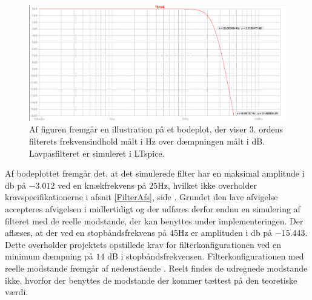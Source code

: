 \begin{figure}[H]
	\centering
	\includegraphics[scale=0.4]{figures/cProblemloesning/Lavpasfiltergraf_LTspice1.PNG}
	\caption{Af figuren fremgår en illustration på et bodeplot, der viser 3. ordens filterets frekvensindhold målt i Hz over dæmpningen målt i dB. Lavpasfilteret er simuleret i LTspice.}
	\label{fig:lavpasfilter_LTspice}
\end{figure}
\noindent Af bodeplottet fremgår det, at det simulerede filter har en maksimal amplitude i db på $-3.012$ ved en knækfrekvens på $25$Hz, hvilket ikke overholder kravspecifikationerne i afsnit \ref{FilterAfs}, side \pageref{FilterAfs}. Grundet den lave afvigelse accepteres afvigelsen i midlertidigt og der udføres derfor endnu en simulering af filteret med de reelle modstande, der kan benyttes under implementeringen. Der aflæses, at der ved en stopbåndsfrekvens på $45$Hz er amplituden i db på $-15.443$. Dette overholder projektets opstillede krav for filterkonfigurationen ved en minimum dæmpning på $14$ dB i stopbåndsfrekvensen. Filterkonfigurationen med reelle modstande fremgår af nedenstående . Reelt findes de udregnede modstande ikke, hvorfor der benyttes de modstande der kommer tættest på den teoretiske værdi. 

%

